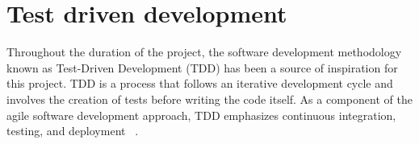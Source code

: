 




\section{Test driven development}
Throughout the duration of the project, the software development methodology known as Test-Driven Development (TDD) has been a source of inspiration for this project. TDD is a process that follows an iterative development cycle and involves the creation of tests before writing the code itself. As a component of the agile software development approach, TDD emphasizes continuous integration, testing, and deployment ~\cite{WhatTestDriven.io}.
\\

